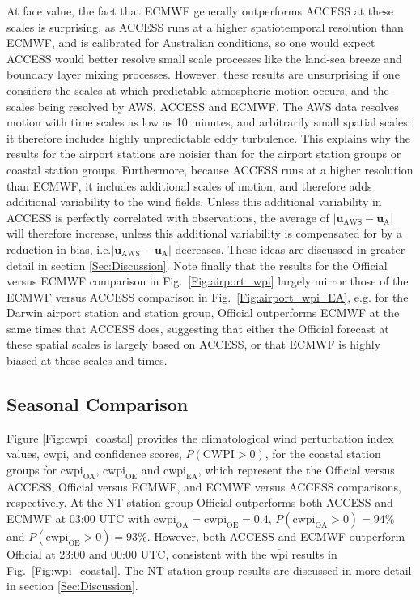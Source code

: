 \documentclass{ametsoc}
\begin{document}
At face value, the fact that ECMWF generally outperforms ACCESS at these scales is surprising, as ACCESS runs at a higher spatiotemporal resolution than ECMWF, and is calibrated for Australian conditions, so one would expect ACCESS would better resolve small scale processes like the land-sea breeze and boundary layer mixing processes. However, these results are unsurprising if one considers the scales at which predictable atmospheric motion occurs, and the scales being resolved by AWS, ACCESS and ECMWF. The AWS data resolves motion with time scales as low as 10 minutes, and arbitrarily small spatial scales: it therefore includes highly unpredictable eddy turbulence. This explains why the results for the airport stations are noisier than for the airport station groups or coastal station groups. Furthermore, because ACCESS runs at a higher resolution than ECMWF, it includes additional scales of motion, and therefore adds additional variability to the wind fields. Unless this additional variability in ACCESS is perfectly correlated with observations, the average of $\left\lvert \boldsymbol{u}_{\text{AWS}}-\boldsymbol{u}_{\text{A}} \right\rvert$
will therefore increase, unless this additional variability is compensated for by a reduction in bias, i.e.$\left\lvert \overline{\boldsymbol{u}}_{\text{AWS}}-\overline{\boldsymbol{u}}_{\text{A}} \right\rvert$ decreases. These ideas are discussed in greater detail in section \ref{Sec:Discussion}. Note finally that the results for the Official versus ECMWF comparison in Fig.~\ref{Fig:airport_wpi} largely mirror those of the ECMWF versus ACCESS comparison in Fig.~\ref{Fig:airport_wpi_EA}, e.g. for the Darwin airport station and station group, Official outperforms ECMWF at the same times that ACCESS does, suggesting that either the Official forecast at these spatial scales is largely based on ACCESS, or that ECMWF is highly biased at these scales and times.

\subsection{Seasonal Comparison}
\label{Sec:Seasonal}
Figure \ref{Fig:cwpi_coastal} provides the climatological wind perturbation index values, $\text{cwpi}$, and confidence scores, $P\left(\text{CWPI}>0\right)$, for the coastal station groups for $\text{cwpi}_\text{OA}$, $\text{cwpi}_\text{OE}$ and $\text{cwpi}_\text{EA}$, which represent the the Official versus ACCESS, Official versus ECMWF, and ECMWF versus ACCESS comparisons, respectively. At the NT station group Official outperforms both ACCESS and ECMWF at 03:00 UTC with $\text{cwpi}_\text{OA} = \text{cwpi}_\text{OE} = 0.4$, $P\left(\text{cwpi}_\text{OA}>0\right) = 94\%$ and $P\left(\text{cwpi}_\text{OE}>0\right) = 93\%$. However, both ACCESS and ECMWF outperform Official at 23:00 and 00:00 UTC, consistent with the $\overline{\text{wpi}}$ results in Fig.~\ref{Fig:wpi_coastal}. The NT station group results are discussed in more detail in section \ref{Sec:Discussion}.
\end{document}

